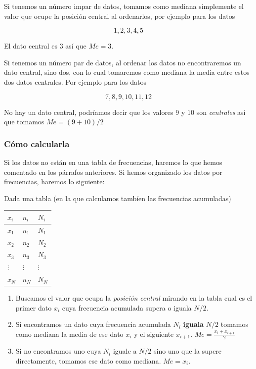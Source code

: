 \documentclass[
]{article}
\providecommand{\tightlist}{%
  \setlength{\itemsep}{0pt}\setlength{\parskip}{0pt}}
\begin{document}
Si tenemos un número impar de datos, tomamos como mediana simplemente el
valor que ocupe la posición central al ordenarlos, por ejemplo para los
datos

\[1, 2, 3, 4, 5\]

El dato central es \(3\) así que \(Me = 3\).

Si tenemos un número par de datos, al ordenar los datos no encontraremos
un dato central, sino dos, con lo cual tomaremos como mediana la media
entre estos dos datos centrales. Por ejemplo para los datos

\[7, 8, 9, 10, 11, 12 \]

No hay un dato central, podríamos decir que los valores \(9\) y \(10\)
son \emph{centrales} así que tomamos \(Me= (9+10)/2\)

\hypertarget{cuxf3mo-calcularla-2}{%
\subsubsection{Cómo calcularla}\label{cuxf3mo-calcularla-2}}

Si los datos no están en una tabla de frecuencias, haremos lo que hemos
comentado en los párrafos anteriores. Si hemos organizado los datos por
frecuencias, haremos lo siguiente:

Dada una tabla (en la que calculamos tambíen las frecuencias acumuladas)

\begin{longtable}[]{@{}lll@{}}
\toprule
\(x_i\) & \(n_i\) & \(N_i\)\tabularnewline
\midrule
\endhead
\(x_1\) & \(n_1\) & \(N_1\)\tabularnewline
\(x_2\) & \(n_2\) & \(N_2\)\tabularnewline
\(x_3\) & \(n_3\) & \(N_3\)\tabularnewline
\(\vdots\) & \(\vdots\) & \(\vdots\)\tabularnewline
\(x_N\) & \(n_N\) & \(N_N\)\tabularnewline
\bottomrule
\end{longtable}

\begin{enumerate}
\def\labelenumi{\arabic{enumi}.}
\tightlist
\item
  Buscamos el valor que ocupa la \emph{posición central} mirando en la
  tabla cual es el primer dato \(x_i\) cuya frecuencia acumulada supera
  o iguala \(N/2\).
\item
  Si encontramos un dato cuya frecuencia acumulada \(N_i\)
  \textbf{iguala} \(N/2\) tomamos como mediana la media de ese dato
  \(x_i\) y el siguiente \(x_{i+1}\). \(Me = \frac{x_{i} + x_{i+1}}{2}\)
\item
  Si no encontramos uno cuya \(N_i\) iguale a \(N/2\) sino uno que la
  supere directamente, tomamos ese dato como mediana. \(Me = x_i\).
\end{enumerate}
\end{document}
